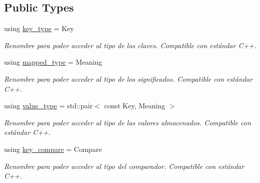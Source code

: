 \subsection*{Public Types}
\begin{DoxyCompactItemize}
\item 
\mbox{\label{classaed2_1_1map_a4273e8812e7105a618df58a2c8b72b7d}} 
using \hyperlink{classaed2_1_1map_a4273e8812e7105a618df58a2c8b72b7d}{key\+\_\+type} = Key
\begin{DoxyCompactList}\small\item\em Renombre para poder acceder al tipo de las claves. Compatible con estándar C++. \end{DoxyCompactList}\item 
\mbox{\label{classaed2_1_1map_aa3e34bf624f3009884a71b18f4ddae40}} 
using \hyperlink{classaed2_1_1map_aa3e34bf624f3009884a71b18f4ddae40}{mapped\+\_\+type} = Meaning
\begin{DoxyCompactList}\small\item\em Renombre para poder acceder al tipo de los significados. Compatible con estándar C++. \end{DoxyCompactList}\item 
\mbox{\label{classaed2_1_1map_a719db98e0ff9a837610f76be33264680}} 
using \hyperlink{classaed2_1_1map_a719db98e0ff9a837610f76be33264680}{value\+\_\+type} = std\+::pair$<$ const Key, Meaning $>$
\begin{DoxyCompactList}\small\item\em Renombre para poder acceder al tipo de las valores almacenados. Compatible con estándar C++. \end{DoxyCompactList}\item 
\mbox{\label{classaed2_1_1map_a3efa081d3379ab76f33a5ef9fe697523}} 
using \hyperlink{classaed2_1_1map_a3efa081d3379ab76f33a5ef9fe697523}{key\+\_\+compare} = Compare
\begin{DoxyCompactList}\small\item\em Renombre para poder acceder al tipo del comparador. Compatible con estándar C++. \end{DoxyCompactList}\item 
\mbox{\label{classaed2_1_1map_af4f147533b3c0207ab036c86ce13ec0d}} 

\end{DoxyCompactItemize}
